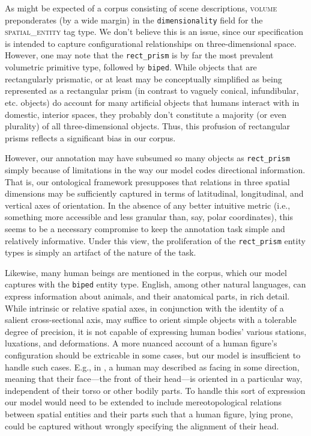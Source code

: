 \documentclass[11pt]{article}
\begin{document}
As might be expected of a corpus consisting of scene descriptions, \textsc{volume} preponderates (by a wide margin) in the \texttt{dimensionality} field for the \textsc{spatial\_entity} tag type. We don't believe this is an issue, since our specification is intended to capture configurational relationships on three-dimensional space. However, one may note that the \texttt{rect\_prism} is by far the most prevalent volumetric primitive type, followed by \texttt{biped}. While objects that are rectangularly prismatic, or at least may be conceptually simplified as being represented as a rectangular prism (in contrast to vaguely conical, infundibular, etc. objects) do account for many artificial objects that humans interact with in domestic, interior spaces, they probably don't constitute a majority (or even plurality) of all three-dimensional objects. Thus, this profusion of rectangular prisms reflects a significant bias in our corpus.

However, our annotation may have subsumed so many objects as \texttt{rect\_prism} simply because of limitations in the way our model codes directional information. That is, our ontological framework presupposes that relations in three spatial dimensions may be sufficiently captured in terms of latitudinal, longitudinal, and vertical axes of orientation. In the absence of any better intuitive metric (i.e., something more accessible and less granular than, say, polar coordinates), this seems to be a necessary compromise to keep the annotation task simple and relatively informative. Under this view, the proliferation of the \texttt{rect\_prism} entity types is simply an artifact of the nature of the task.

Likewise, many human beings are mentioned in the corpus, which our model captures with the \texttt{biped} entity type. English, among other natural languages, can express information about animals, and their anatomical parts, in rich detail. While intrinsic or relative spatial axes, in conjunction with the identity of a salient cross-sectional axis, may suffice to orient simple objects with a tolerable degree of precision, it is not capable of expressing human bodies' various stations, luxations, and deformations. A more nuanced account of a human figure's configuration should be extricable in some cases, but our model is insufficient to handle such cases. E.g., in     , a human may described as facing in some direction, meaning that their face---the front of their head---is oriented in a particular way, independent of their torso or other bodily parts. To handle this sort of expression our model would need to be extended to include mereotopological relations between spatial entities and their parts such that a human figure, lying prone, could be captured without wrongly specifying the alignment of their head.
\end{document}
